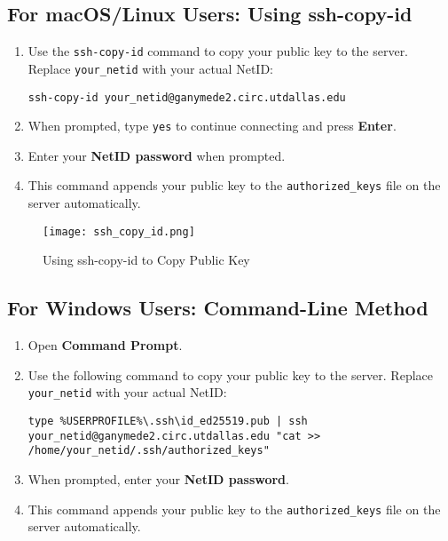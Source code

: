 \documentclass[12pt,letterpaper]{article}
\begin{document}
    \subsection{For macOS/Linux Users: Using ssh-copy-id}

    \begin{enumerate}
        \item Use the \texttt{ssh-copy-id} command to copy your public key to the server. Replace \texttt{your\_netid} with your actual NetID:
        \begin{lstlisting}[style=custombash]
ssh-copy-id your_netid@ganymede2.circ.utdallas.edu
        \end{lstlisting}
        \item When prompted, type \texttt{yes} to continue connecting and press \textbf{Enter}.
        \item Enter your \textbf{NetID password} when prompted.
        \item This command appends your public key to the \texttt{authorized\_keys} file on the server automatically.
    \end{enumerate}

    \begin{figure}[H]
        \centering
        \texttt{[image: ssh\_copy\_id.png]}
        \caption{Using ssh-copy-id to Copy Public Key}
        \label{fig:ssh_copy_id}
    \end{figure}

    \subsection{For Windows Users: Command-Line Method}

    \begin{enumerate}
        \item Open \textbf{Command Prompt}.
        \item Use the following command to copy your public key to the server. Replace \texttt{your\_netid} with your actual NetID:
        \begin{lstlisting}[style=custombash]
type %USERPROFILE%\.ssh\id_ed25519.pub | ssh your_netid@ganymede2.circ.utdallas.edu "cat >> /home/your_netid/.ssh/authorized_keys"
        \end{lstlisting}
        \item When prompted, enter your \textbf{NetID password}.
        \item This command appends your public key to the \texttt{authorized\_keys} file on the server automatically.
    \end{enumerate}
\end{document}
